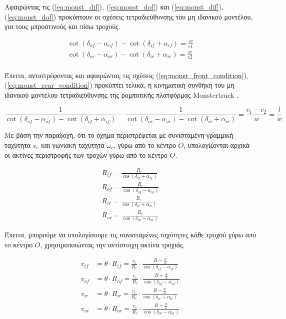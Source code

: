 {\bigskip
Αφαιρώντας τις (\ref{eq:monst_dif}), (\ref{eq:monst_dof}) και (\ref{eq:monst_dif}), (\ref{eq:monst_dof}) προκύπτουν οι σχέσεις τετραδιεύθυνσης του μη ιδανικού μοντέλου, για τους μπροστινούς και πίσω τροχούς.

\begin{align}
	\cot(\delta_{of} - \alpha_{of}) - \cot(\delta_{if} + \alpha_{if}) = \frac{w}{c1}
	\label{eq:monst_front_condition}\\
	\cot(\delta_{or} - \alpha_{or}) - \cot(\delta_{ir} + \alpha_{ir}) = \frac{w}{c2}
	\label{eq:monst_rear_condition}\\
\end{align}

\bigskip
Έπειτα, αντιστρέφοντας και αφαιρώντας τις σχέσεις (\ref{eq:monst_front_condition}), (\ref{eq:monst_rear_condition}) προκύπτει τελικά, η {κινηματική συνθήκη του μη ιδανικού μοντέλου τετραδιεύθυνσης της ρομποτικής πλατφόρμας Monstertruck} \cite{4ws_kinematics}. 

\begin{equation}
	\frac{1}{\cot(\delta_{of} - \alpha_{of}) - \cot(\delta_{if} + \alpha_{if})} - \frac{1}{\cot(\delta_{or} - \alpha_{or}) - \cot(\delta_{ir} + \alpha_{ir})} = \frac{c_1 - c_2}{w} = \frac{l}{w}
	\label{eq:monst_kinematic_condition}
\end{equation}

\bigskip
Με βάση την παραδοχή, ότι το όχημα περιστρέφεται με συνισταμένη γραμμική ταχύτητα $v_c$ και γωνιακή ταχύτητα $\omega_c$, γύρω από το κέντρο $O$, υπολογίζονται αρχικά οι ακτίνες περιστροφής των τροχών γύρω από το κέντρο $O$.

\begin{align}
	R_{if} = \frac{R_c}{\cos(\delta_{if} + \alpha_{if})}
	\label{eq:monst_rif}\\
	R_{of} = \frac{R_c}{\cos(\delta_{of} - \alpha_{of})}
	\label{eq:monst_rof}\\
	R_{ir} = \frac{R_c}{\cos(\delta_{ir} + \alpha_{ir})}
	\label{eq:monst_rir}\\
	R_{or} = \frac{R_c}{\cos(\delta_{or} - \alpha_{or})}
	\label{eq:monst_ror}
\end{align}

\bigskip
Έπειτα, μπορούμε να υπολογίσουμε τις συνισταμένες ταχύτητες κάθε τροχού γύρω από το κέντρο $O$, χρησιμοποιώντας την αντίστοιχη ακτίνα τροχιάς.

\begin{align}
	\label{eq:monst_vif}	
	v_{if} &= \dot\theta \cdot R_{if} = \frac{v_c}{R_c} \cdot \frac{R - \frac{w}{2}}{\cos(\delta_{if} - \alpha_{if})}\\
	\label{eq:monst_vof}	
	v_{of} &= \dot\theta \cdot R_{of} = \frac{v_c}{R_c} \cdot \frac{R + \frac{w}{2}}{\cos(\delta_{of} - \alpha_{of})}\\
	\label{eq:monst_vir}	
	v_{ir} &= \dot\theta \cdot R_{ir} = \frac{v_c}{R_c} \cdot \frac{R - \frac{w}{2}}{\cos(\delta_{ir} + \alpha_{ir})} \\
	\label{eq:monst_vor}
	v_{or} &= \dot\theta \cdot R_{or} = \frac{v_c}{R_c} \cdot \frac{R + \frac{w}{2}}{\cos(\delta_{or} - \alpha_{or})}
\end{align}

}
